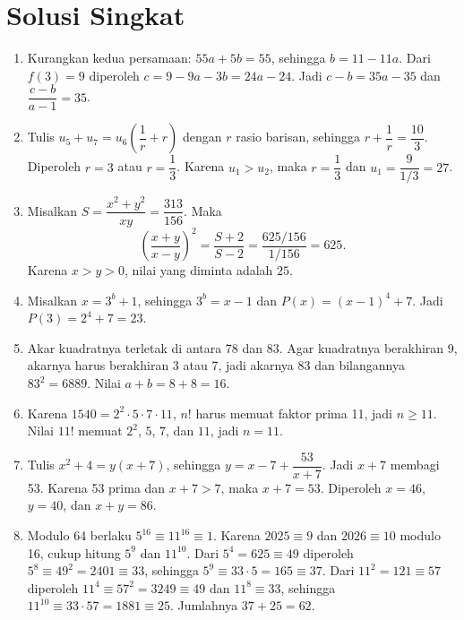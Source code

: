 \documentclass[12pt]{scrartcl}
\begin{document}
\section*{Solusi Singkat}
\begin{enumerate}
	\item Kurangkan kedua persamaan: $55a+5b=55$, sehingga $b=11-11a$.
	Dari $f(3)=9$ diperoleh $c=9-9a-3b=24a-24$.
	Jadi $c-b=35a-35$ dan $\dfrac{c-b}{a-1}=\boxed{35}$.

	\item Tulis $u_{5}+u_{7}=u_{6}\left(\dfrac{1}{r}+r\right)$ dengan $r$ rasio barisan,
	sehingga $r+\dfrac{1}{r}=\dfrac{10}{3}$. Diperoleh $r=3$ atau $r=\dfrac{1}{3}$.
	Karena $u_{1}>u_{2}$, maka $r=\dfrac{1}{3}$ dan $u_{1}=\dfrac{9}{1/3}=\boxed{27}$.

	\item Misalkan $S=\dfrac{x^{2}+y^{2}}{xy}=\dfrac{313}{156}$. Maka
	\[ \left(\frac{x+y}{x-y}\right)^{2}=\frac{S+2}{S-2}
	=\frac{625/156}{1/156}=625. \]
	Karena $x>y>0$, nilai yang diminta adalah $\boxed{25}$.

	\item Misalkan $x=3^{b}+1$, sehingga $3^{b}=x-1$ dan $P(x)=(x-1)^{4}+7$.
	Jadi $P(3)=2^{4}+7=\boxed{23}$.

	\item Akar kuadratnya terletak di antara 78 dan 83. Agar kuadratnya berakhiran 9,
	akarnya harus berakhiran 3 atau 7, jadi akarnya 83 dan bilangannya $83^{2}=6889$.
	Nilai $a+b=8+8=\boxed{16}$.

	\item Karena $1540=2^{2}\cdot 5\cdot 7\cdot 11$, $n!$ harus memuat faktor prima 11,
	jadi $n \ge 11$. Nilai $11!$ memuat $2^{2}$, $5$, $7$, dan $11$, jadi $n=\boxed{11}$.

	\item Tulis $x^{2}+4=y(x+7)$, sehingga $y=x-7+\dfrac{53}{x+7}$.
	Jadi $x+7$ membagi 53. Karena 53 prima dan $x+7>7$, maka $x+7=53$.
	Diperoleh $x=46$, $y=40$, dan $x+y=\boxed{86}$.

	\item Modulo 64 berlaku $5^{16} \equiv 11^{16} \equiv 1$.
	Karena $2025 \equiv 9$ dan $2026 \equiv 10$ modulo 16, cukup hitung
	$5^{9}$ dan $11^{10}$. Dari $5^{4}=625 \equiv 49$ diperoleh
	$5^{8} \equiv 49^{2}=2401 \equiv 33$, sehingga $5^{9} \equiv 33\cdot 5=165 \equiv 37$.
	Dari $11^{2}=121 \equiv 57$ diperoleh $11^{4} \equiv 57^{2}=3249 \equiv 49$ dan
	$11^{8} \equiv 33$, sehingga $11^{10} \equiv 33\cdot 57=1881 \equiv 25$.
	Jumlahnya $37+25=\boxed{62}$.


\end{enumerate}
\end{document}
